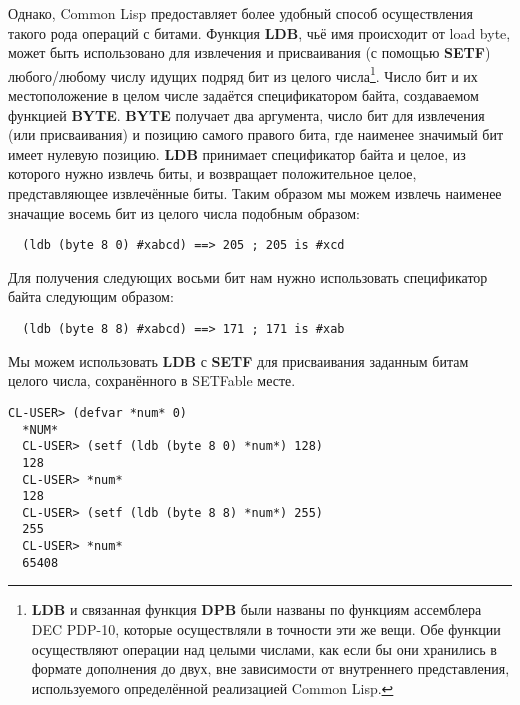 Однако, Common Lisp предоставляет более удобный способ осуществления такого рода операций
с битами. Функция \textbf{LDB}, чьё имя происходит от load byte, может быть использовано
для извлечения и присваивания (с помощью \textbf{SETF}) любого/любому числу идущих подряд
бит из целого числа\footnote{\textbf{LDB} и связанная функция \textbf{DPB} были названы по
  функциям ассемблера DEC PDP-10, которые осуществляли в точности эти же вещи. Обе функции
  осуществляют операции над целыми числами, как если бы они хранились в формате дополнения
  до двух, вне зависимости от внутреннего представления, используемого определённой
  реализацией Common Lisp.}. Число бит и их местоположение в целом числе задаётся
спецификатором байта, создаваемом функцией \textbf{BYTE}. \textbf{BYTE} получает два
аргумента, число бит для извлечения (или присваивания) и позицию самого правого бита, где
наименее значимый бит имеет нулевую позицию. \textbf{LDB} принимает спецификатор байта и
целое, из которого нужно извлечь биты, и возвращает положительное целое, представляющее
извлечённые биты. Таким образом мы можем извлечь наименее значащие восемь бит из целого
числа подобным образом:

\begin{lstlisting}
  (ldb (byte 8 0) #xabcd) ==> 205 ; 205 is #xcd
\end{lstlisting}

Для получения следующих восьми бит нам нужно использовать спецификатор байта  следующим образом:

\begin{lstlisting}
  (ldb (byte 8 8) #xabcd) ==> 171 ; 171 is #xab
\end{lstlisting}

Мы можем использовать \textbf{LDB} с \textbf{SETF} для присваивания заданным битам целого
числа, сохранённого в SETFable месте.

\begin{lstlisting}[style=lisprepl]
  CL-USER> (defvar *num* 0)
  *NUM*
  CL-USER> (setf (ldb (byte 8 0) *num*) 128)
  128
  CL-USER> *num*
  128
  CL-USER> (setf (ldb (byte 8 8) *num*) 255)
  255
  CL-USER> *num*
  65408
\end{lstlisting}

